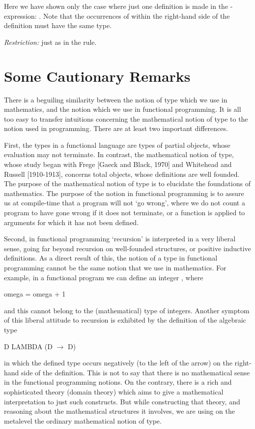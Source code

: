 \noindent
Here we have shown only the case where just one definition is made in the
-expression: . Note that the occurrences of  within
the right-hand side of the definition must have the same type.

\textit{Restriction:} just as in the  rule.

\section{Some Cautionary Remarks}

There is a beguiling similarity between the notion of type which we use in
mathematics, and the notion which we use in functional programming. It is all
too easy to transfer intuitions concerning the mathematical notion of type to
the notion used in programming. There are at least two important differences.

First, the types in a functional language are types of partial objects, whose
evaluation may not terminate. In contrast, the mathematical notion of type,
whose study began with Frege [Gaeck and Black, 1970] and Whitehead and
Russell [1910-1913], concerns total objects, whose definitions are well
founded. The purpose of the mathematical notion of type is to elucidate the
foundations of mathematics. The purpose of the notion in functional programming
is to assure us at compile-time that a program will not `go wrong',
where we do not count a program to have gone wrong if it does not terminate,
or a function is applied to arguments for which it has not been defined.

Second, in functional programming `recursion' is interpreted in a very
liberal sense, going far beyond recursion on well-founded structures, or
positive inductive definitions. As a direct result of this, the notion of a type in
functional programming cannot be the same notion that we use in
mathematics. For example, in a functional program we can define an integer
, where
\begin{mlcoded}
    omega = omega + 1
\end{mlcoded}
and this cannot belong to the (mathematical) type of integers. Another
symptom of this liberal attitude to recursion is exhibited by the definition of
the algebraic type
\begin{mlcoded}
    D \typedecl{} LAMBDA (D $\rightarrow$ D)
\end{mlcoded}
in which the defined type occurs negatively (to the left of the arrow) on the
right-hand side of the definition. This is not to say that there is no mathematical
sense in the functional programming notions. On the contrary, there
is a rich and sophisticated theory (domain theory) which aims to give a
mathematical interpretation to just such constructs. But while constructing
that theory, and reasoning about the mathematical structures it involves, we
are using on the metalevel the ordinary mathematical notion of type.

